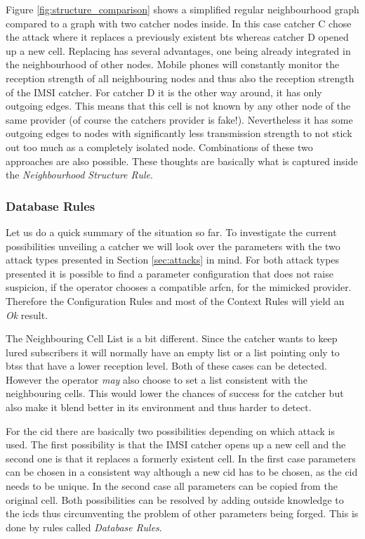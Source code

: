 Figure \ref{fig:structure_comparison} shows a simplified regular neighbourhood graph compared to a graph with two catcher nodes inside.
In this case catcher C chose the attack where it replaces a previously existent \gls{bts} whereas catcher D opened up a new cell.
Replacing has several advantages, one being already integrated in the neighbourhood of other nodes.
Mobile phones will constantly monitor the reception strength of all neighbouring nodes and thus also the reception strength of the IMSI catcher.
For catcher D it is the other way around, it has only outgoing edges.
This means that this cell is not known by any other node of the same provider (of course the catchers provider is fake!).
Nevertheless it has some outgoing edges to nodes with significantly less transmission strength to not stick out too much as a completely isolated node.
Combinations of these two approaches are also possible.
These thoughts are basically what is captured inside the \emph{Neighbourhood Structure Rule}.

\subsubsection{Database Rules}
Let us do a quick summary of the situation so far.
To investigate the current possibilities unveiling a catcher we will look over the parameters with the two attack types presented in Section \ref{sec:attacks} in mind.
For both attack types presented it is possible to find a parameter configuration that does not raise suspicion, if the operator chooses a compatible \gls{arfcn}, \etc for the mimicked provider.
Therefore the Configuration Rules and most of the Context Rules will yield an \emph{Ok} result.

The Neighbouring Cell List is a bit different.
Since the catcher wants to keep lured subscribers it will normally have an empty list or a list pointing only to \glspl{bts} that have a lower reception level. 
Both of these cases can be detected.
However the operator \emph{may} also choose to set a list consistent with the neighbouring cells.
This would lower the chances of success for the catcher but also make it blend better in its environment and thus harder to detect.
 
For the \gls{cid} there are basically two possibilities depending on which attack is used.
The first possibility is that the IMSI catcher opens up a new cell and the second one is that it replaces a formerly existent cell.
In the first case parameters can be chosen in a consistent way although a new \gls{cid} has to be chosen, as the \gls{cid} needs to be unique.
In the second case all parameters can be copied from the original cell.
Both possibilities can be resolved by adding outside knowledge to the \gls{icds} thus circumventing the problem of other parameters being forged.
This is done by rules called \emph{Database Rules}.

